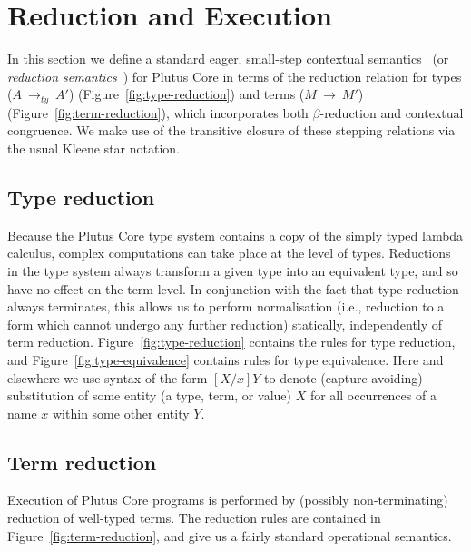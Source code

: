 \documentclass[a4paper]{article}
\newcommand{\typeStep}[2]{#1 ~ \rightarrow_{ty} ~ #2}
\newcommand{\step}[2]{#1 ~ \rightarrow ~ #2}
\begin{document}
\section{Reduction and Execution}
\label{sec:reduction}

In this section we define a standard eager,
small-step contextual semantics~\citep[5.3]{Harper:PFPL} (or
\textit{reduction semantics}~\citep[\S2]{Felleisen-Hieb}) for Plutus
Core in terms of the reduction relation for types
(\(\typeStep{A}{A'}\)) (Figure~\ref{fig:type-reduction})
and terms (\(\step{M}{M'}\)) (Figure~\ref{fig:term-reduction}), which
incorporates both $\beta$-reduction and contextual congruence. We make
use of the transitive closure of these stepping relations via the
usual Kleene star notation.


\subsection{Type reduction}
Because the Plutus Core type system contains a copy of the simply
typed lambda calculus, complex computations can take place at the
level of types.  Reductions in the type system always transform a
given type into an equivalent type, and so have no effect on the term
level.  In conjunction with the fact that type reduction always
terminates, this allows us to perform normalisation (i.e., reduction
to a form which cannot undergo any further reduction) statically,
independently of term reduction.  Figure~\ref{fig:type-reduction}
contains the rules for type reduction, and
Figure~\ref{fig:type-equivalence} contains rules for type equivalence.
Here and elsewhere we use syntax of the form $[X/x]Y$ to denote
(capture-avoiding) substitution of some entity (a type, term, or
value) $X$ for all occurrences of a name $x$ within some other entity
$Y$.




\newpage
\subsection{Term reduction}
Execution of Plutus Core programs is performed by (possibly
non-terminating) reduction of well-typed terms.  The reduction rules
are contained in Figure~\ref{fig:term-reduction}, and give us a fairly
standard operational semantics.
\end{document}
